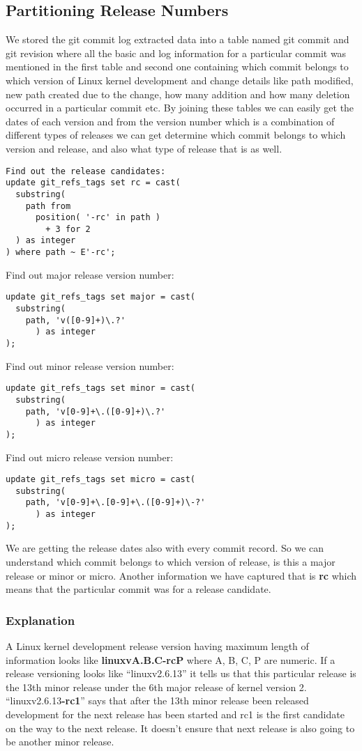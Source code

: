 \documentclass{acm_proc_article-sp}
\begin{document}
\subsection{Partitioning Release Numbers}
We stored the git commit log extracted data into a table named git commit and git revision where all the basic and log information for a particular commit was mentioned in the first table and second one containing which commit belongs to which version of Linux kernel development and change details like path modified, new path created due to the change, how many addition and how many deletion occurred in a particular commit etc. By joining these tables we can easily get the dates of each version and from the version number which is a combination of different types of releases we can get determine which commit belongs to which version and release, and also what type of release that is as well.

\begin{lstlisting}
Find out the release candidates:
update git_refs_tags set rc = cast(
  substring(
    path from
      position( '-rc' in path )
        + 3 for 2 
  ) as integer
) where path ~ E'-rc';
\end{lstlisting}
Find out major release version number:
\begin{lstlisting}
update git_refs_tags set major = cast(
  substring(
    path, 'v([0-9]+)\.?'
      ) as integer
);
\end{lstlisting}
Find out minor release version number:
\begin{lstlisting}
update git_refs_tags set minor = cast(
  substring(
    path, 'v[0-9]+\.([0-9]+)\.?'
      ) as integer
);
\end{lstlisting}
Find out micro release version number:
\begin{lstlisting}
update git_refs_tags set micro = cast(
  substring(
    path, 'v[0-9]+\.[0-9]+\.([0-9]+)\-?'
      ) as integer
);
\end{lstlisting}

We are getting the release dates also with every commit record. So we can understand which commit belongs to which version of release, is this a major release or minor or micro. Another information we have captured that is \textbf{rc} which means that the particular commit was for a release candidate.

\subsubsection{Explanation}
A Linux kernel development release version having maximum length of information looks like \textbf{linuxvA.B.C-rcP} where A, B, C, P are numeric. If a release versioning looks like ``linuxv2.6.13'' it tells us that this particular release is the 13th minor release  under  the 6th major release of kernel version 2. ``linuxv2.6.13\textbf{-rc1}'' says that after the 13th minor release been released development for the next release has been started and rc1 is the first candidate on the way to the next release. It doesn't ensure that next release is also going to be another minor release.
\end{document}
